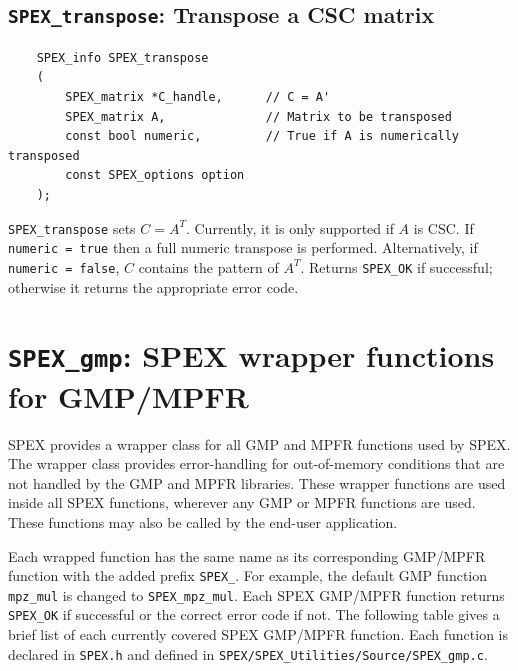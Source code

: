 \documentclass[12pt,oneside]{book}
\theoremstyle{definition}
\begin{document}


\subsection{\texttt{SPEX\_transpose}: Transpose a CSC matrix}
\begin{mdframed}[userdefinedwidth=\textwidth]
{\footnotesize
\begin{verbatim}
    SPEX_info SPEX_transpose
    (
        SPEX_matrix *C_handle,      // C = A'
        SPEX_matrix A,              // Matrix to be transposed
        const bool numeric,         // True if A is numerically transposed
        const SPEX_options option
    ); 
\end{verbatim}
} \end{mdframed}

\verb|SPEX_transpose| sets $C = A^T$. Currently, it is only supported if $A$ is CSC. If \verb|numeric = true| then a full numeric transpose is performed. Alternatively, if \verb|numeric = false|, $C$ contains the pattern of $A^T$. Returns \verb|SPEX_OK| if successful; otherwise it returns the appropriate error code.


\newpage
\section{\texttt{SPEX\_gmp}: SPEX wrapper functions for GMP/MPFR}
SPEX provides a wrapper class for all GMP and MPFR functions used by SPEX.
The wrapper class provides error-handling for out-of-memory conditions
that are not handled by the GMP and MPFR libraries.  These wrapper functions
are used inside all SPEX functions, wherever any GMP or MPFR functions are
used.  These functions may also be called by the end-user application. 

Each wrapped function has the same name as its corresponding GMP/MPFR function
with the added prefix \verb|SPEX_|. For example, the default GMP function
\verb|mpz_mul| is changed to \verb|SPEX_mpz_mul|. Each SPEX GMP/MPFR function
returns \verb|SPEX_OK| if successful or the correct error code if not. The
following table gives a brief list of each currently covered SPEX GMP/MPFR
function. Each function is declared in \verb|SPEX.h| and defined in
\verb|SPEX/SPEX_Utilities/Source/SPEX_gmp.c|.
\end{document}
